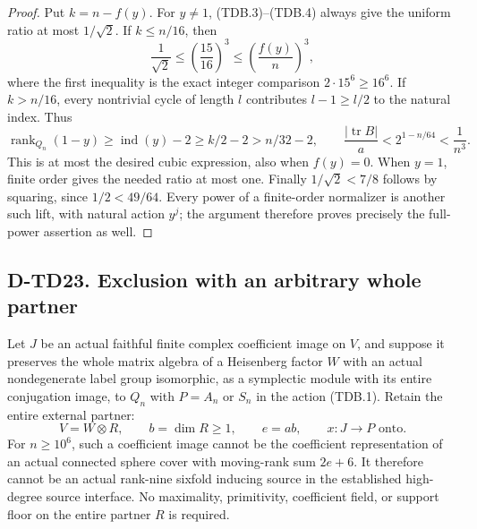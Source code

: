 \begin{proof}
Put $k=n-f(y)$. For $y\ne1$, (TDB.3)--(TDB.4) always give
the uniform ratio at most $1/\sqrt2$. If $k\le n/16$, then
\[
 \frac1{\sqrt2}\le\left(\frac{15}{16}\right)^3
                     \le\left(\frac{f(y)}n\right)^3,
 \tag{TDB.8}
\]
where the first inequality is the exact integer comparison
$2\cdot15^6\ge16^6$.
If $k>n/16$, every nontrivial cycle of length $l$ contributes
$l-1\ge l/2$ to the natural index. Thus
\[
 \operatorname{rank}_{Q_n}(1-y)\ge\operatorname{ind}(y)-2
          \ge k/2-2>n/32-2,
 \qquad
 \frac{|\operatorname{tr}B|}{a}
       <2^{1-n/64}<\frac1{n^3}.
 \tag{TDB.9}
\]
This is at most the desired cubic expression, also when $f(y)=0$.
When $y=1$, finite order gives the needed ratio at most one.
Finally $1/\sqrt2<7/8$ follows by squaring, since $1/2<49/64$.
Every power of a finite-order normalizer is another such lift,
with natural action $y^j$; the argument therefore proves precisely
the full-power assertion as well.
\end{proof}

\subsection*{D-TD23. Exclusion with an arbitrary whole partner}

\begin{theorem}[D-TD23]
Let $J$ be an actual faithful finite complex coefficient image
on $V$, and suppose it preserves the whole matrix algebra of
a Heisenberg factor $W$ with an actual nondegenerate label group
isomorphic, as a symplectic module with its entire conjugation image,
to $Q_n$ with $P=A_n$ or $S_n$ in the action (TDB.1).
Retain the entire external partner:
\[
 V=W\otimes R,\qquad b=\dim R\ge1,\qquad
 e=ab,\qquad x:J\longrightarrow P\text{ onto}.
 \tag{TDB.10}
\]
For $n\ge10^6$, such a coefficient image cannot be the coefficient
representation of an actual connected sphere cover with moving-rank
sum $2e+6$. It therefore cannot be an actual rank-nine sixfold
inducing source in the established high-degree source interface.
No maximality, primitivity, coefficient field, or support floor
on the entire partner $R$ is required.
\end{theorem}

